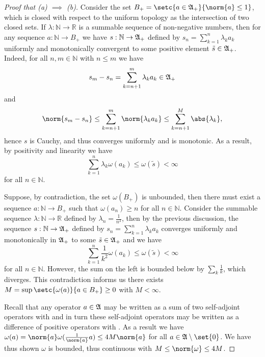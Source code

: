 \begin{proof}[Proof that (a) \(\implies\) (b)]
    Consider the set \(B_+ = \setc{a \in \algebra{A}_+}{\norm{a} \leq 1}\), which is closed with respect to the uniform topology as the intersection of two closed sets. If \(\lambda : \mathbb{N} \to \mathbb{R}\) is a summable sequence of non-negative numbers, then for any sequence \(a : \mathbb{N} \to B_+\) we have \(s : \mathbb{N} \to \mathfrak{A}_+\) defined by \(s_n = \sum_{k = 1}^{n}\lambda_k a_k\) uniformly and monotonically convergent to some positive element \(\tilde{s} \in \mathfrak{A}_+\). Indeed, for all \(n, m \in \mathbb{N}\) with \(n \leq m\) we have
    \begin{equation*}
        s_m - s_n = \sum_{k=n+1}^m \lambda_k a_k \in \mathfrak{A}_+
    \end{equation*}
    and
    \begin{equation*}
        \norm{s_m - s_n} \leq \sum_{k = n+1}^m \norm{\lambda_k a_k} \leq \sum_{k = n+1}^M \abs{\lambda_k},
    \end{equation*}
    hence \(s\) is Cauchy, and thus converges uniformly and is monotonic. As a result, by positivity and linearity we have
    \begin{equation*}
        \sum_{k = 1}^{n} \lambda_k \omega(a_k) \leq \omega(\tilde{s}) < \infty
    \end{equation*}
    for all \(n \in \mathbb{N}\).

    Suppose, by contradiction, the set \(\omega(B_+)\) is unbounded, then there must exist a sequence \(a : \mathbb{N} \to B_+\) such that \(\omega(a_n) \geq n\) for all \(n \in \mathbb{N}\). Consider the summable sequence \(\lambda : \mathbb{N} \to \mathbb{R}\) defined by \(\lambda_n = \frac1{n^2}\), then by the previous discussion, the sequence \(s : \mathbb{N} \to \mathfrak{A}_+\) defined by \(s_n = \sum_{k = 1}^{n} \lambda_k a_k\) converges uniformly and monotonically in \(\mathfrak{A}_+\) to some \(\tilde{s} \in \mathfrak{A}_+\) and we have
    \begin{equation*}
        \sum_{k = 1}^{n} \frac{1}{k^2} \omega(a_k) \leq \omega(\tilde{s}) < \infty
    \end{equation*}
    for all \(n \in \mathbb{N}\). However, the sum on the left is bounded below by \(\sum_{k} \frac1k\), which diverges. This contradiction informs us there exists \(M = \sup{\setc{\omega(a)}{a \in B_+}} \geq 0\) with \(M < \infty\).

    Recall that any operator \(a \in \mathfrak{A}\) may be written as a sum of two self-adjoint operators with  and in turn these self-adjoint operators may be written as a difference of positive operators with . As a result we have \(\omega(a) = \norm{a} \omega(\frac1{\norm{a}}a) \leq 4M \norm{a}\) for all \(a \in \algebra{A} \setminus \set{0}\). We have thus shown \(\omega\) is bounded, thus continuous with \(M \leq \norm{\omega} \leq 4M\).


\end{proof}
